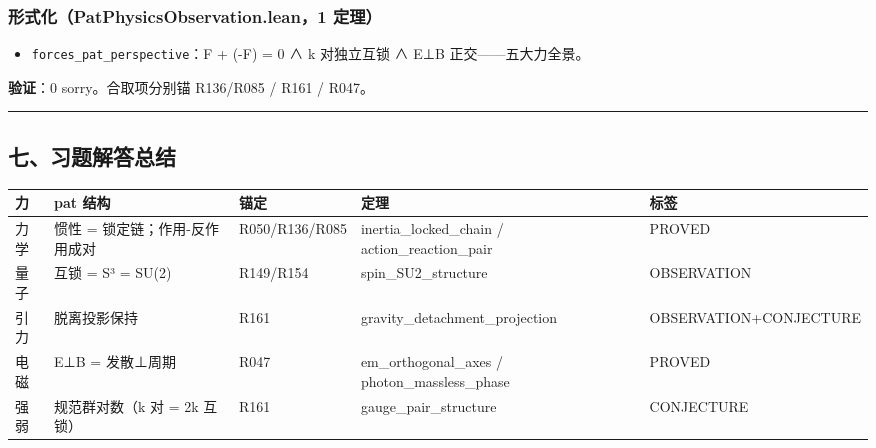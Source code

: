 \documentclass[
]{article}
\newcounter{none} %
\providecommand{\tightlist}{%
  \setlength{\itemsep}{0pt}\setlength{\parskip}{0pt}}
\begin{document}
\subsubsection{形式化（PatPhysicsObservation.lean，1
定理）}\label{ux5f62ux5f0fux5316patphysicsobservation.lean1-ux5b9aux7406-3}

\begin{itemize}
\tightlist
\item
  \texttt{forces\_pat\_perspective}：F + (-F) = 0 ∧ k 对独立互锁 ∧ E⊥B
  正交------五大力全景。
\end{itemize}

\textbf{验证}：0 sorry。合取项分别锚 R136/R085 / R161 / R047。

\begin{center}\rule{0.5\linewidth}{0.5pt}\end{center}

\subsection{七、习题解答总结}\label{ux4e03ux4e60ux9898ux89e3ux7b54ux603bux7ed3}

{\def\LTcaptype{none} %
\begin{longtable}[]{@{}
  >{\raggedright\arraybackslash}p{}
  >{\raggedright\arraybackslash}p{}
  >{\raggedright\arraybackslash}p{}
  >{\raggedright\arraybackslash}p{}
  >{\raggedright\arraybackslash}p{}@{}}
\toprule\noalign{}
\begin{minipage}[b]{\linewidth}\raggedright
力
\end{minipage} & \begin{minipage}[b]{\linewidth}\raggedright
pat 结构
\end{minipage} & \begin{minipage}[b]{\linewidth}\raggedright
锚定
\end{minipage} & \begin{minipage}[b]{\linewidth}\raggedright
定理
\end{minipage} & \begin{minipage}[b]{\linewidth}\raggedright
标签
\end{minipage} \\
\midrule\noalign{}
\endhead
\bottomrule\noalign{}
\endlastfoot
力学 & 惯性 = 锁定链；作用-反作用成对 & R050/R136/R085 &
inertia\_locked\_chain / action\_reaction\_pair & PROVED \\
量子 & 4 互锁 = S³ = SU(2) & R149/R154 & spin\_SU2\_structure &
OBSERVATION \\
引力 & 脱离投影保持 & R161 & gravity\_detachment\_projection &
OBSERVATION+CONJECTURE \\
电磁 & E⊥B = 发散⊥周期 & R047 & em\_orthogonal\_axes /
photon\_massless\_phase & PROVED \\
强弱 & 规范群对数（k 对 = 2k 互锁） & R161 & gauge\_pair\_structure &
CONJECTURE \\
\end{longtable}
}
\end{document}

